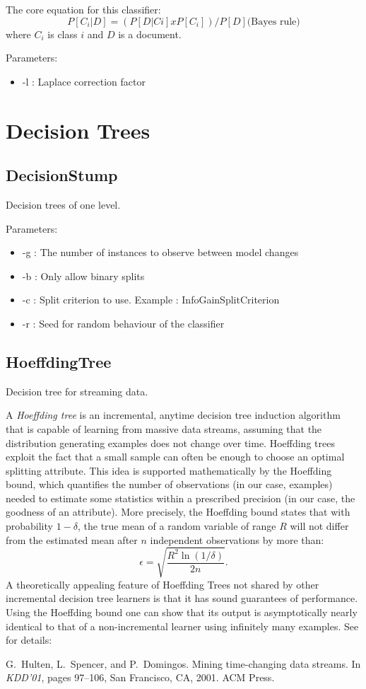 \documentclass[a4paper,12pt,twoside]{book}
\begin{document}
 The core equation for this classifier:
 $$ P[C_i|D] = (P[D|Ci] x P[C_i]) / P[D] \textrm{(Bayes rule)}$$
  where $C_i$ is class $i$ and $D$ is a document.
 
Parameters:
\begin{itemize}
\item -l : Laplace correction factor
\end{itemize}

\section{Decision Trees}

\subsection{DecisionStump}  Decision trees of one level.

Parameters:

\begin{itemize}
\item -g : The number of instances to observe between model changes
\item -b : Only allow binary splits
\item -c : Split criterion to use. Example : InfoGainSplitCriterion
\item -r : Seed for random behaviour of the classifier
\end{itemize}

\subsection{HoeffdingTree} Decision tree for streaming data.

A {\em Hoeffding tree} is an incremental, anytime decision tree 
induction algorithm that is capable of learning from massive data streams, 
assuming that the distribution generating examples does not change over time.
Hoeffding trees exploit the fact that a small sample can often be enough to choose 
an optimal splitting attribute. This idea is supported mathematically by the 
Hoeffding bound, which quantifies the number of observations (in our case, 
examples) needed to estimate some statistics within a prescribed precision (in 
our case, the goodness of an attribute). 
More precisely, the Hoeffding bound states that with probability $1 - \delta$, 
the true mean of a random variable of range $R$ will not differ from the estimated 
mean after $n$ independent observations by more than:
$$ \epsilon = \sqrt{\frac{R^2 \ln(1/\delta)}{2n}}.$$
A theoretically appealing feature of Hoeffding Trees not shared by other 
incremental decision tree learners is that it has sound guarantees of performance. 
Using the Hoeffding bound one can show that its output is asymptotically nearly 
identical to that of a non-incremental learner using infinitely many examples.
See for details:
\begin{itemize}
G.~Hulten, L.~Spencer, and P.~Domingos.
\newblock Mining time-changing data streams.
\newblock In {\em KDD'01}, pages 97--106, San Francisco, CA, 2001. ACM Press.\end{itemize}
\end{document}
